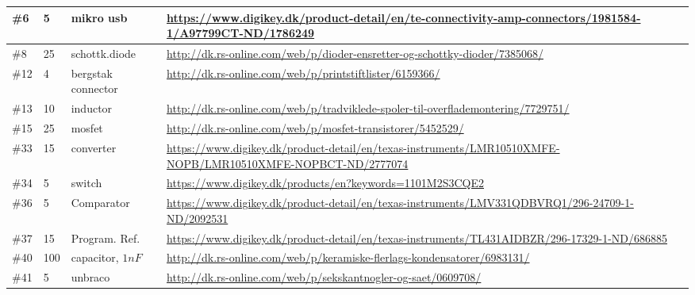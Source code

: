 \documentclass[11pt]{article}
\begin{document}
\begin{landscape}
\begin{table}[]
\begin{tabular}{|p{1.5cm}|p{3.5cm}|p{2.5cm} |p{11cm}|}
\#6             & 5                         & mikro usb             & \url{https://www.digikey.dk/product-detail/en/te-connectivity-amp-connectors/1981584-1/A97799CT-ND/1786249}       \\ \hline
\#8             & 25                        & schottk.diode         & \url{http://dk.rs-online.com/web/p/dioder-ensretter-og-schottky-dioder/7385068/}                                  \\ \hline
\#12            & 4                         & bergstak connector             & \url{http://dk.rs-online.com/web/p/printstiftlister/6159366/}                        \\ \hline
\#13            & 10                        & inductor              & \url{http://dk.rs-online.com/web/p/tradviklede-spoler-til-overflademontering/7729751/}                            \\ \hline
\#15            & 25                        & mosfet                & \url{http://dk.rs-online.com/web/p/mosfet-transistorer/5452529/}                     \\ \hline
\#33            & 15                        & converter             & \url{https://www.digikey.dk/product-detail/en/texas-instruments/LMR10510XMFE-NOPB/LMR10510XMFE-NOPBCT-ND/2777074} \\ \hline
\#34            & 5                         & switch                & \url{https://www.digikey.dk/products/en?keywords=1101M2S3CQE2}                       \\ \hline
\#36            & 5                         & Comparator            & \url{https://www.digikey.dk/product-detail/en/texas-instruments/LMV331QDBVRQ1/296-24709-1-ND/2092531}             \\ \hline
\#37            & 15                        & Program. Ref.         & \url{https://www.digikey.dk/product-detail/en/texas-instruments/TL431AIDBZR/296-17329-1-ND/686885}                \\ \hline
\#40            & 100                       & capacitor, $1nF$        & \url{http://dk.rs-online.com/web/p/keramiske-flerlags-kondensatorer/6983131/}        \\ \hline
\#41            & 5                       & unbraco     & \url{http://dk.rs-online.com/web/p/sekskantnogler-og-saet/0609708/}        \\ \hline




\end{tabular}
\end{table}

\end{landscape}
\end{document}
